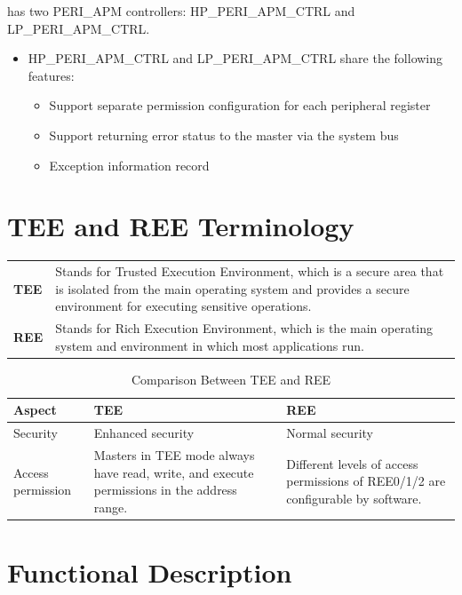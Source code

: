 \documentclass[main\_\_EN.tex]{subfiles}
\begin{document}
\chipname{} has two PERI\_APM controllers: HP\_PERI\_APM\_CTRL and LP\_PERI\_APM\_CTRL.
\begin{itemize}
    \item HP\_PERI\_APM\_CTRL and LP\_PERI\_APM\_CTRL share the following features:
        \begin{itemize}
        \item Support separate permission configuration for each peripheral register
        \item Support returning error status to the master via the system bus
        \item Exception information record
        \end{itemize}
\end{itemize}

\section{TEE and REE Terminology}

\begin{longtable}[L]{ R{2cm} p{13cm} }

\textbf{TEE} & Stands for Trusted Execution Environment, which is a secure area that is isolated from the main operating system and provides a secure environment for executing sensitive operations. \\

\textbf{REE} & Stands for Rich Execution Environment, which is the main operating system and environment in which most applications run.
\end{longtable}

\begin{longtable}{|L{3cm}|L{6cm}|L{7cm}|}
    \caption{Comparison Between TEE and REE}
    \label{tab:tee-ree-comparison}\\
\hline{}
\textbf{Aspect} & \textbf{TEE} & \textbf{REE} \\
\hline
Security & Enhanced security & Normal security \\
\hline
Access permission &  Masters in TEE mode always have read, write, and execute permissions in the address range. & Different levels of access permissions of REE0/1/2 are configurable by software.\\
\hline
\end{longtable}

\section{Functional Description}
\end{document}
